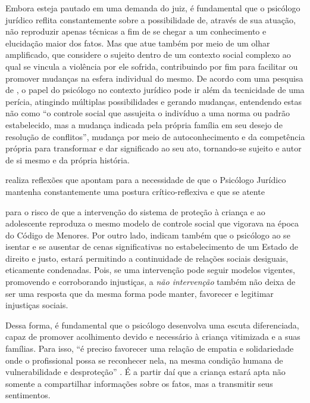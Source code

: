 Embora esteja pautado em uma demanda do juiz, é fundamental que o psicólogo jurídico reflita constantemente sobre a possibilidade de, através de sua atuação, não reproduzir apenas técnicas a fim de se chegar a um conhecimento e elucidação maior dos fatos. Mas que atue também por meio de um olhar amplificado, que considere o sujeito dentro de um contexto social complexo ao qual se vincula a violência por ele sofrida, contribuindo por fim para facilitar ou promover mudanças na esfera individual do mesmo. De acordo com uma pesquisa de , o papel do psicólogo no contexto jurídico pode ir além da tecnicidade de uma perícia, atingindo múltiplas possibilidades e gerando mudanças, entendendo estas não como ``o controle social que assujeita o indivíduo a uma norma ou padrão estabelecido, mas a mudança indicada pela própria família em seu desejo de resolução de conflitos'', mudança por meio de autoconhecimento e da competência própria para transformar e dar significado ao seu ato, tornando-se sujeito e autor de si mesmo e da própria história. 

 realiza reflexões que apontam para a necessidade de que o Psicólogo Jurídico mantenha constantemente uma postura crítico-reflexiva e que se atente  

\begin{citacao}
	para o risco de que a intervenção do sistema de proteção à criança e ao adolescente reproduza o mesmo modelo de controle social que vigorava na época do Código de Menores. Por outro lado, indicam também que o psicólogo ao se isentar e se ausentar de cenas significativas no estabelecimento de um Estado de direito e justo, estará permitindo a continuidade de relações sociais desiguais, eticamente condenadas. Pois, se uma intervenção pode seguir modelos vigentes, promovendo e corroborando injustiças, a \emph{não intervenção} também não deixa de ser uma resposta que da mesma forma pode manter, favorecer e legitimar injustiças sociais.
\end{citacao}

Dessa forma, é fundamental que o psicólogo desenvolva uma escuta diferenciada, capaz de promover acolhimento devido e necessário à criança vitimizada e a suas famílias. Para isso, ``é preciso favorecer uma relação de empatia e solidariedade onde o profissional possa se reconhecer nela, na mesma condição humana de vulnerabilidade e desproteção'' \cite[p. 25]{SANTOS2009}. É a partir daí que a criança estará apta não somente a compartilhar informações sobre os fatos, mas a transmitir seus sentimentos. 

